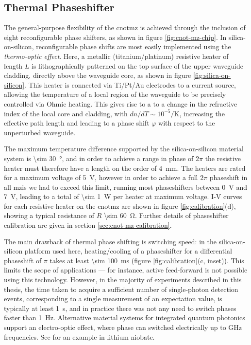\subsection{Thermal Phaseshifter} 
\label{sec:thermal-phaseshifter}
The general-purpose flexibility of the \gls{cnotmz} is achieved through the inclusion of eight reconfigurable phase shifters, as shown in figure \ref{fig:cnot-mz-chip}. 
In silica-on-silicon, reconfigurable phase shifts are most easily implemented using the \emph{thermo-optic effect}. Here, a metallic (titanium/platinum) resistive heater of length $L$ is lithographically patterned on the top surface of the upper waveguide cladding, directly above the waveguide core, as shown in figure \ref{fig:silica-on-silicon}. This heater is connected via Ti/Pt/Au electrodes to a current source, allowing the temperature of a local region of the waveguide to be precisely controlled via Ohmic heating. This gives rise to a to a change in the refractive index of the local core and cladding, with $dn/dT \sim 10^{-5} / \text{K}$, increasing the effective path length and leading to a phase shift $\varphi$ with respect to the unperturbed waveguide. 

The maximum temperature difference supported by the silica-on-silicon material system is \SI{\sim 30}{\degree}, and in order to achieve a range in phase of 2$\pi$ the resistive heater must therefore have a length on the order of \SI{4}{\milli \metre}. 
The heaters are rated for a maximum voltage of \SI{5}{\volt}, however in order to achieve a full $2\pi$ phaseshift in all \glspl{mzi} we had to exceed this limit, running most phaseshifters between \SI{0}{\volt} and \SI{7}{\volt}, leading to a total of  \SI{\sim 1}{\watt} per heater at maximum voltage. I-V curves for each resistive heater on the \gls{cnotmz} are shown in figure \ref{fig:calibration}(d), showing a typical resistance of $R$ \SI{\sim 60}{\ohm}. Further details of phaseshifter calibration are given in section \ref{sec:cnot-mz-calibration}.

The main drawback of thermal phase shifting is switching speed: in the silica-on-silicon platform used here, heating/cooling of a phaseshifter for a differential phaseshift of $\pi$ takes at least \SI{\sim 100}{\milli \second} (figure \ref{fig:calibration}(c, inset)). This limits the scope of applications --- for instance, active feed-forward is not possible using this technology. However, in the majority of experiments described in this thesis, the time taken to acquire a sufficient number of single-photon detection events, corresponding to a single measurement of an expectation value, is typically at least \SI{1}{\second}, and in practice there was not any need to switch phases faster than \SI{1}{\hertz}. Alternative material systems for integrated quantum photonics support an electro-optic effect, where phase can switched electrically up to \si{\giga \hertz} frequencies. See \cite{Bonneau2012b} for an example in lithium niobate.

